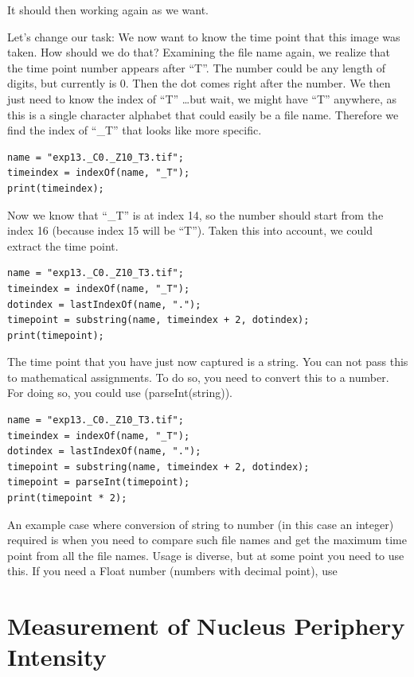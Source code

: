 It should then working again as we want. 

Let's change our task: We now want to know the time point that this image was taken. How should we do that? Examining the file name again, we realize that the time point number appears after ``T''. The number could be any length of digits, but currently is 0. Then the dot comes right after the number. We then just need to know the index of ``T'' \ldots but wait, we might have ``T'' anywhere, as this is a single character alphabet that could easily be a file name. Therefore we find the index of ``\_T'' that looks like more specific. 

\begin{lstlisting}
name = "exp13._C0._Z10_T3.tif";
timeindex = indexOf(name, "_T");
print(timeindex);
\end{lstlisting}

Now we know that ``\_T'' is at index 14, so the number should start from the index 16 (because index 15 will be ``T''). Taken this into account, we could extract the time point. 

\begin{lstlisting}
name = "exp13._C0._Z10_T3.tif";
timeindex = indexOf(name, "_T");
dotindex = lastIndexOf(name, ".");
timepoint = substring(name, timeindex + 2, dotindex);
print(timepoint);
\end{lstlisting}

The time point that you have just now captured is a string. You can not pass this to mathematical assignments. To do so, you need to convert this to a number. For doing so, you could use \ilcom(parseInt(string)). 

\begin{lstlisting}
name = "exp13._C0._Z10_T3.tif";
timeindex = indexOf(name, "_T");
dotindex = lastIndexOf(name, ".");
timepoint = substring(name, timeindex + 2, dotindex);
timepoint = parseInt(timepoint);
print(timepoint * 2);
\end{lstlisting}

An example case where conversion of string to number (in this case an integer) required is when you need to compare such file names and get the maximum time point from all the file names. Usage is diverse, but at some point you need to use this. If you need a Float number (numbers with decimal point), use 



\clearpage

\section{Measurement of Nucleus Periphery Intensity}

